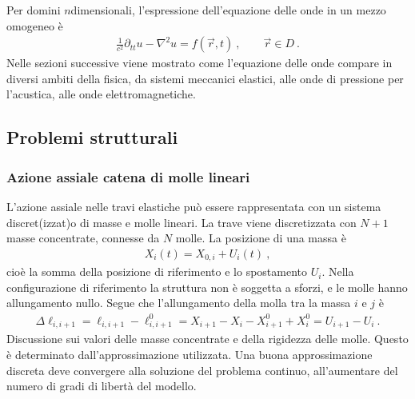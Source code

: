 \documentclass[letterpaper,10pt,italian]{jupyterBook}
\begin{document}
\sphinxAtStartPar
Per domini \(n\)\sphinxhyphen{}dimensionali, l’espressione dell’equazione delle onde in un mezzo omogeneo è
\begin{equation*}
\begin{split}\frac{1}{c^2} \partial_{tt} u - \nabla^2 u = f(\vec{r}, t) \ , \qquad \vec{r} \in D \ .\end{split}
\end{equation*}
\sphinxAtStartPar
Nelle sezioni successive viene mostrato come l’equazione delle onde compare in diversi ambiti della fisica, da sistemi meccanici elastici, alle onde di pressione per l’acustica, alle onde elettromagnetiche.


\subsection{Problemi strutturali}
\label{\detokenize{ch/waves/waves-in-physics:problemi-strutturali}}\label{\detokenize{ch/waves/waves-in-physics:physics-hs-waves-equation-examples-mechanics}}

\subsubsection{Azione assiale \sphinxhyphen{} catena di molle lineari}
\label{\detokenize{ch/waves/waves-in-physics:azione-assiale-catena-di-molle-lineari}}\label{\detokenize{ch/waves/waves-in-physics:physics-hs-waves-equation-examples-mechanics-axial}}
\sphinxAtStartPar
L’azione assiale nelle travi elastiche può essere rappresentata con un sistema discret(izzat)o di masse e molle lineari. La trave viene discretizzata con \(N+1\) masse concentrate, connesse da \(N\) molle. La posizione di una massa è
\begin{equation*}
\begin{split}X_i(t) = X_{0,i} + U_i(t) \ ,\end{split}
\end{equation*}
\sphinxAtStartPar
cioè la somma della posizione di riferimento e lo spostamento \(U_i\). Nella configurazione di riferimento la struttura non è soggetta a sforzi, e le molle hanno allungamento nullo. Segue che l’allungamento della molla tra la massa \(i\) e \(j\) è
\begin{equation*}
\begin{split}\Delta \ell_{i,i+1} = \ell_{i,i+1} - \ell_{i,i+1}^0 = X_{i+1} - X_{i} - X_{i+1}^0 + X_{i}^0 = U_{i+1} - U_{i} \ .\end{split}
\end{equation*}
\sphinxAtStartPar
{} Discussione sui valori delle masse concentrate e della rigidezza delle molle. Questo è determinato dall’approssimazione utilizzata. Una buona approssimazione discreta deve convergere alla soluzione del problema continuo, all’aumentare del numero di gradi di libertà del modello.
\end{document}
